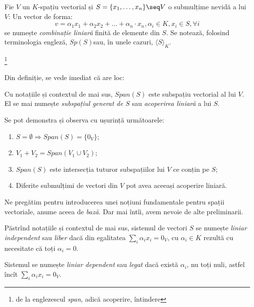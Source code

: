 \begin{definition}
Fie $V$ un $K$-spațiu vectorial și $S = \{x_1, \dots, x_n\} \seq V$ o 
submulțime nevidă a lui $V$: Un vector de forma: 
\[
v = \alpha_1 x_1 + \alpha_2 x_2 + \dots + \alpha_n \cdot x_n, 
\alpha_i \in K, x_i \in S, \forall i
\] 
se numește \emph{combinație liniară} finită de elemente din $S$. Se notează, 
folosind terminologia engleză, $Sp(S)$\footnotemark sau, în unele cazuri, 
$\langle S \rangle_K$.
\end{definition}
\footnote{de la englezescul \emph{span}, adică acoperire, întindere}

Din definiție, se vede imediat că are loc:
\begin{proposition}
Cu notațiile și contextul de mai sus, $Span(S)$ este subspațiu vectorial al 
lui $V$. El se mai numește \emph{subspațiul generat de $S$} sau 
\emph{acoperirea liniară} a lui $S$.
\end{proposition}

Se pot demonstra și observa cu ușurință următoarele:
\begin{remark}
\begin{enumerate}[(1)]
\item $S = \emptyset \Longrightarrow Span(S) = \{0_V\}$;
\item $V_1 + V_2 = Span(V_1 \cup V_2)$;
\item $Span(S)$ este intersecția tuturor subspațiilor lui $V$ ce conțin pe $S$;
\item Diferite submulțimi de vectori din $V$ pot avea aceeași acoperire liniară.
\end{enumerate}
\end{remark}

Ne pregătim pentru introducerea unei noțiuni fundamentale pentru spații 
vectoriale, anume aceea de \emph{bază}. Dar mai întîi, avem nevoie de alte 
preliminarii.
\begin{definition} 
Păstrînd notațiile și contextul de mai sus, sistemul de vectori $S$ se numește 
\emph{liniar independent} sau \emph{liber} dacă din egalitatea 
$\sum_i \alpha_i x_i = 0_V$, cu $\alpha_i \in K$ rezultă cu necesitate că 
toți $\alpha_i = 0$.

Sistemul se numește \emph{liniar dependent} sau \emph{legat} dacă există 
$\alpha_i$, nu toți nuli, astfel încît $\sum_i \alpha_i x_i = 0_V$.
\end{definition}

